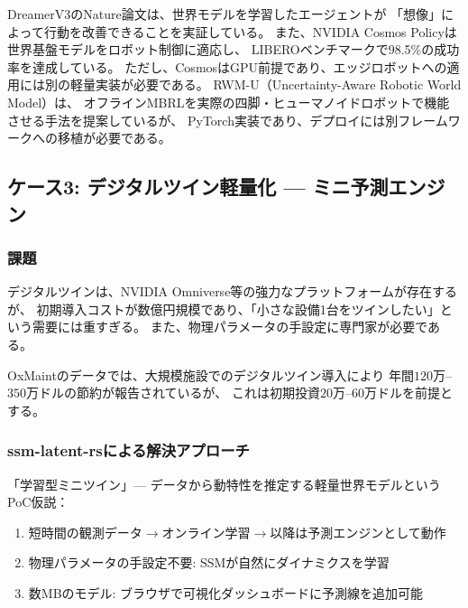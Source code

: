 \documentclass[11pt,a4paper]{ltjsarticle}
\begin{document}
DreamerV3のNature論文は、世界モデルを学習したエージェントが
「想像」によって行動を改善できることを実証している\cite{hafner2023dreamerv3}。
また、NVIDIA Cosmos Policyは世界基盤モデルをロボット制御に適応し、
LIBEROベンチマークで98.5\%の成功率を達成している\cite{nvidiacosmospolicy}。
ただし、CosmosはGPU前提であり、エッジロボットへの適用には別の軽量実装が必要である。
RWM-U（Uncertainty-Aware Robotic World Model）は、
オフラインMBRLを実際の四脚・ヒューマノイドロボットで機能させる手法を提案しているが\cite{rwmu2025}、
PyTorch実装であり、デプロイには別フレームワークへの移植が必要である。

\subsection{ケース3: デジタルツイン軽量化 --- ミニ予測エンジン}

\subsubsection{課題}

デジタルツインは、NVIDIA Omniverse等の強力なプラットフォームが存在するが、
初期導入コストが数億円規模であり、「小さな設備1台をツインしたい」という需要には重すぎる。
また、物理パラメータの手設定に専門家が必要である。

OxMaintのデータでは、大規模施設でのデジタルツイン導入により
年間$120$万--$350$万ドルの節約が報告されているが\cite{oxmaint2026smartfactory}、
これは初期投資$20$万--$60$万ドルを前提とする。

\subsubsection{ssm-latent-rsによる解決アプローチ}

「学習型ミニツイン」--- データから動特性を推定する軽量世界モデルというPoC仮説：

\begin{enumerate}
  \item 短時間の観測データ$\to$オンライン学習$\to$以降は予測エンジンとして動作
  \item 物理パラメータの手設定不要: SSMが自然にダイナミクスを学習
  \item 数MBのモデル: ブラウザで可視化ダッシュボードに予測線を追加可能
\end{enumerate}
\end{document}
